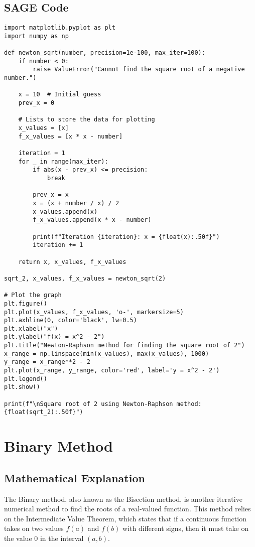 \documentclass{article}
\theoremstyle{definition}
\begin{document}
\subsection{SAGE Code}

\begin{lstlisting}[style=sage, caption={Newton-Raphson Method},captionpos=t]
import matplotlib.pyplot as plt
import numpy as np

def newton_sqrt(number, precision=1e-100, max_iter=100):
	if number < 0:
		raise ValueError("Cannot find the square root of a negative number.")
	
	x = 10  # Initial guess
	prev_x = 0
	
	# Lists to store the data for plotting
	x_values = [x]
	f_x_values = [x * x - number]
	
	iteration = 1
	for _ in range(max_iter):
		if abs(x - prev_x) <= precision:
			break
	
		prev_x = x
		x = (x + number / x) / 2
		x_values.append(x)
		f_x_values.append(x * x - number)
		
		print(f"Iteration {iteration}: x = {float(x):.50f}")
		iteration += 1
	
	return x, x_values, f_x_values

sqrt_2, x_values, f_x_values = newton_sqrt(2)

# Plot the graph
plt.figure()
plt.plot(x_values, f_x_values, 'o-', markersize=5)
plt.axhline(0, color='black', lw=0.5)
plt.xlabel("x")
plt.ylabel("f(x) = x^2 - 2")
plt.title("Newton-Raphson method for finding the square root of 2")
x_range = np.linspace(min(x_values), max(x_values), 1000)
y_range = x_range**2 - 2
plt.plot(x_range, y_range, color='red', label='y = x^2 - 2')
plt.legend()
plt.show()

print(f"\nSquare root of 2 using Newton-Raphson method: {float(sqrt_2):.50f}")
\end{lstlisting}

\newpage
\section{Binary Method}
\subsection{Mathematical Explanation}
The Binary method, also known as the Bisection method, is another iterative numerical method to find the roots of a real-valued function. This method relies on the Intermediate Value Theorem, which states that if a continuous function takes on two values $f(a)$ and $f(b)$ with different signs, then it must take on the value 0 in the interval $(a, b)$.
\end{document}
